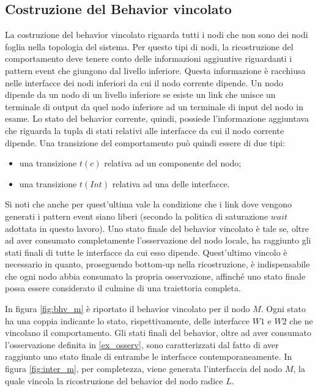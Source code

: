 \subsection{Costruzione del Behavior vincolato}
La costruzione del behavior vincolato riguarda tutti i nodi che non sono dei nodi foglia nella topologia del sistema. Per questo tipi di nodi, la ricostruzione del comportamento deve tenere conto delle informazioni aggiuntive riguardanti i pattern event che giungono dal livello inferiore. Questa informazione è racchiusa nelle interfacce dei nodi inferiori da cui il nodo corrente dipende. Un nodo dipende da un nodo di un livello inferiore se esiste un link che unisce un terminale di output da quel nodo inferiore ad un terminale di input del nodo in esame. Lo stato del behavior corrente, quindi, possiede l'informazione aggiuntava che riguarda la tupla di stati relativi alle interfacce da cui il nodo corrente dipende. Una transizione del comportamento può quindi essere di due tipi:
\begin{itemize}
\item una transizione $t(c)$ relativa ad un componente del nodo;
\item una transizione $t(Int)$ relativa ad una delle interfacce.
\end{itemize} 
Si noti che anche per quest'ultima vale la condizione che i link dove vengono generati i pattern event siano liberi (secondo la politica di saturazione $wait$ adottata in questo lavoro).
Uno stato finale del behavior vincolato è tale se, oltre ad aver consumato completamente l'osservazione del nodo locale, ha raggiunto gli stati finali di tutte le interfacce da cui esso dipende. Quest'ultimo vincolo è necessario in quanto, proseguendo bottom-up nella ricostruzione, è indispensabile che ogni nodo abbia consumato la propria osservazione, affinché uno stato finale possa essere considerato il culmine di una traiettoria completa.

\begin{ex}
In figura \ref{fig:bhv_m} è riportato il behavior vincolato per il nodo $M$. Ogni stato ha una coppia indicante lo stato, rispettivamente, delle interfacce $W1$ e $W2$ che ne vincolano il comportamento. Gli stati finali del behavior, oltre ad aver consumato l'osservazione definita in \ref{ex_osserv}, sono caratterizzati dal fatto di aver raggiunto uno stato finale di entrambe le interfacce contemporaneamente.
In figura \ref{fig:inter_m}, per completezza, viene generata l'interfaccia del nodo $M$, la quale vincola la ricostruzione del behavior del nodo radice $L$.
\end{ex}

